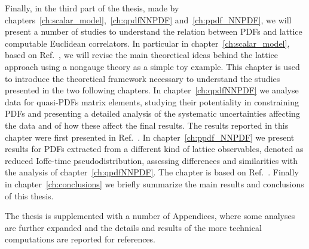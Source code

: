 %
Finally, in the third part of the thesis, made by chapters~\ref{ch:scalar_model},~\ref{ch:qpdfNNPDF} and~\ref{ch:ppdf_NNPDF}, 
we will present a number of studies to understand the relation between PDFs and lattice computable
Euclidean correlators.
In particular in chapter~\ref{ch:scalar_model}, based on Ref.~\cite{DelDebbio:2020cbz},
we will revise the main theoretical ideas behind the lattice approach
using a nongauge theory as a simple toy example. This chapter is used to introduce the theoretical framework necessary
to understand the studies presented in the two following chapters.
In chapter~\ref{ch:qpdfNNPDF} we analyse data for quasi-PDFs matrix elements, studying their potentiality
in constraining PDFs and presenting a detailed analysis of the systematic uncertainties affecting the data and of how
these affect the final results. The results reported in this chapter were first presented in Ref.~\cite{Cichy:2019ebf}.
In chapter~\ref{ch:ppdf_NNPDF} we present results for PDFs extracted from a different kind of lattice 
observables, denoted as reduced Ioffe-time pseudodistribution, assessing differences and similarities with
the analysis of chapter~\ref{ch:qpdfNNPDF}. The chapter is based on Ref.~\cite{DelDebbio:2020rgv}.
Finally in chapter~\ref{ch:conclusions} we briefly summarize the main results and conclusions of this thesis. 

The thesis is supplemented with a number of Appendices, where some analyses are further expanded and 
the details and results of the more technical computations are reported for references. 





